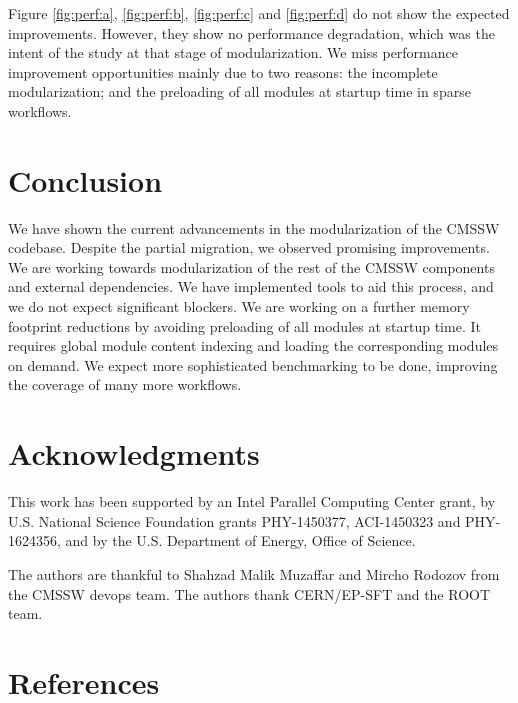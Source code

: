 \documentclass[12pt]{iopart}
\begin{document}
Figure \ref{fig:perf:a}, \ref{fig:perf:b}, \ref{fig:perf:c} and \ref{fig:perf:d} do not show the expected improvements. However, they show no performance degradation, which was the intent of the study at that stage of modularization. We miss performance improvement opportunities mainly due to two reasons: the incomplete modularization; and the preloading of all modules at startup time in sparse workflows.

\section{Conclusion}
We have shown the current advancements in the modularization of the CMSSW codebase. Despite the partial migration, we observed promising  improvements. We are working towards modularization of the rest of the CMSSW components and external dependencies. We have implemented tools to aid this process, and we do not expect significant blockers. We are working on a further memory footprint reductions by avoiding preloading of all modules at startup time. It requires global module content indexing and loading the corresponding modules on demand. We expect more sophisticated benchmarking to be done, improving the coverage of many more workflows.

\section{Acknowledgments}
\label{ack}

This work has been supported by an Intel Parallel Computing Center grant, by U.S. National Science Foundation grants PHY-1450377, ACI-1450323 and PHY-1624356, and by the U.S. Department of Energy, Office of Science.

The authors are thankful to Shahzad Malik Muzaffar and Mircho Rodozov from the CMSSW devops team. The authors thank CERN/EP-SFT and the ROOT team.


\section*{References}
\end{document}
